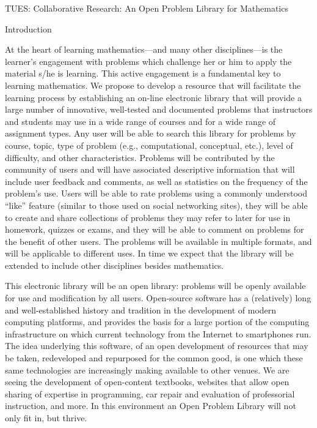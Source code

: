\documentclass[11pt]{article}
\begin{document}
\begin{center}
\Large TUES:  Collaborative Research: An Open Problem Library for Mathematics
\end{center}

\begin{section}{Introduction}

At the heart of learning mathematics---and many other disciplines---is the
learner's engagement with problems which challenge her or him to apply the
material s/he is learning.  This active engagement is a fundamental key to
learning mathematics.  We propose to develop a resource that will
facilitate the learning process by establishing an on-line electronic
library that will provide a large number of innovative, well-tested and
documented problems that instructors and students may use in a wide range
of courses and for a wide range of assignment types.  Any user will be
able to search this library for problems by course, topic, type of problem
(e.g., computational, conceptual, etc.), level of difficulty, and other
characteristics.  Problems will be contributed by the community of users
and will have associated descriptive information that will include user
feedback and comments, as well as statistics on the frequency of the
problem's use.  Users will be able to rate problems using a commonly
understood ``like'' feature (similar to those used on social networking
sites), they will be able to create and share collections of problems they
may refer to later for use in homework, quizzes or exams, and they will be
able to comment on problems for the benefit of other users.  The problems
will be available in multiple formats, and will be applicable to different
uses.  In time we expect that the library will be extended to include
other disciplines besides mathematics.

This electronic library will be an open library: problems will be openly
available for use and modification by all users.  Open-source software has
a (relatively) long and well-established history and tradition in the
development of modern computing platforms, and provides the basis for a
large portion of the computing infrastructure on which current technology
from the Internet to smartphones run.  The idea underlying this software,
of an open development of resources that may be taken, redeveloped and
repurposed for the common good, is one which these same technologies are
increasingly making available to other venues. We are seeing the
development of open-content textbooks, websites that allow open sharing of
expertise in programming, car repair and evaluation of professorial
instruction, and more.  In this environment an Open Problem Library will
not only fit in, but thrive.


\end{section}
\end{document}
